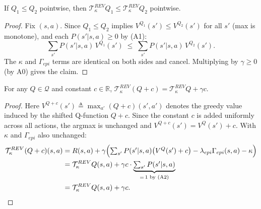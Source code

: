 \medskip
\begin{lemma}[Monotonicity]
    \label{lem:monotonicity}
    If $Q_1 \le Q_2$ pointwise, then $\mathcal{T}^{REV}_\kappa Q_1 \le \mathcal{T}^{REV}_\kappa Q_2$ pointwise.
\end{lemma}
\begin{proof}
Fix $(s,a)$.  Since $Q_1 \le Q_2$ implies $V^{Q_1}(s') \le V^{Q_2}(s')$ for all $s'$ (max is monotone), and each $P(s'|s,a) \ge 0$ by (A1):
\begin{equation}
    \sum_{s'} P(s'|s,a)\,V^{Q_1}(s') \;\le\; \sum_{s'} P(s'|s,a)\,V^{Q_2}(s').
\end{equation}
The $\kappa$ and $\Gamma_{epi}$ terms are identical on both sides and cancel.  Multiplying by $\gamma \ge 0$ (by A0) gives the claim.
\end{proof}

\begin{lemma}[Discounting]
    \label{lem:discounting}
    For any $Q \in \mathcal{Q}$ and constant $c \in \mathbb{R}$,
    $\mathcal{T}^{REV}_\kappa(Q + c) = \mathcal{T}^{REV}_\kappa Q + \gamma c$.
\end{lemma}
\begin{proof}
Here $V^{Q+c}(s') \triangleq \max_{a'}(Q+c)(s',a')$ denotes the greedy value induced by the shifted Q-function $Q+c$. Since the constant $c$ is added uniformly across all actions, the argmax is unchanged and $V^{Q+c}(s') = V^Q(s') + c$. With $\kappa$ and $\Gamma_{epi}$ also unchanged:
\begin{align}
    \mathcal{T}^{REV}_\kappa(Q+c)(s,a)
    &= R(s,a) + \gamma \Bigl(
        \textstyle\sum_{s'} P(s'|s,a)\bigl(V^Q(s')+c\bigr) - \lambda_{epi}\Gamma_{epi}(s,a) - \kappa
    \Bigr) \notag \\
    &= \mathcal{T}^{REV}_\kappa Q(s,a)
    + \gamma c \cdot \underbrace{\textstyle\sum_{s'}P(s'|s,a)}_{=\,1\text{ by (A2)}} \notag \\
    &= \mathcal{T}^{REV}_\kappa Q(s,a) + \gamma c. \qedhere
\end{align}
\end{proof}

